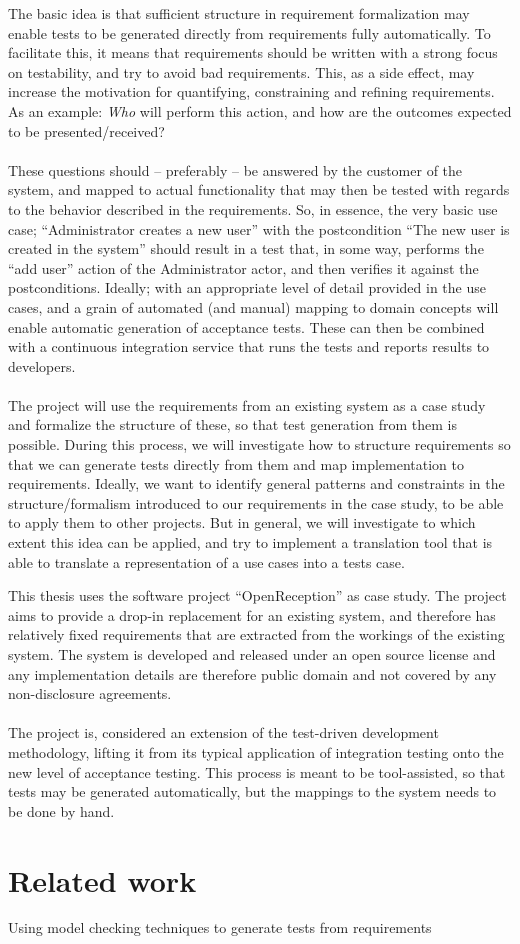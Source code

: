 The basic idea is that sufficient structure in requirement formalization may enable tests to be generated directly from requirements fully automatically. To facilitate this, it means that requirements should be written with a strong focus on testability, and try to avoid bad requirements. This, as a side effect, may increase the motivation for quantifying, constraining and refining requirements. As an example: \emph{Who} will perform this action, and how are the outcomes expected to be presented/received?\\\\
These questions should -- preferably -- be answered by the customer of the system, and mapped to actual functionality that may then be tested with regards to the behavior described in the requirements. So, in essence, the very basic use case; ``Administrator creates a new user'' with the postcondition ``The new user is created in the system'' should result in a test that, in some way, performs the ``add user'' action of the Administrator actor, and then verifies it against the postconditions. Ideally; with an appropriate level of detail provided in the use cases, and a grain of automated (and manual) mapping to domain concepts will enable automatic generation of acceptance tests. These can then be combined with a continuous integration service that runs the tests and reports results to developers.\\\\
The project will use the requirements from an existing system as a case study and formalize the structure of these, so that test generation from them is possible. During this process, we will investigate how to structure requirements so that we can generate tests directly from them and map implementation to requirements. Ideally, we want to identify general patterns and constraints in the structure/formalism introduced to our requirements in the case study, to be able to apply them to other projects. But in general, we will investigate to which extent this idea can be applied, and try to implement a translation tool that is able to translate a representation of a use cases into a tests case.

This thesis uses the software project ``OpenReception'' as case study. The project aims to provide a drop-in replacement for an existing system, and therefore has relatively fixed requirements that are extracted from the workings of the existing system. The system is developed and released under an open source license and any implementation details are therefore public domain and not covered by any non-disclosure agreements. \\\\
The project is, considered an extension of the test-driven development methodology, lifting it from its typical application of integration testing onto the new level of acceptance testing. This process is meant to be tool-assisted, so that tests may be generated automatically, but the mappings to the system needs to be done by hand.

\section{Related work}
Using model checking techniques to generate tests from requirements\cite{gargantini1999using}
